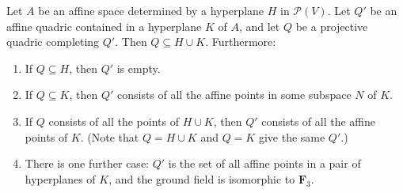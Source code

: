 Let $A$ be an affine space determined by a hyperplane $H$ in $\mathcal{P}(V)$. Let $Q'$ be an affine quadric contained in a hyperplane $K$ of $A$, and let $Q$ be a projective quadric completing $Q'$. Then $Q \subseteq H \cup K$. Furthermore:

\begin{enumerate}
\item If $Q \subseteq H$, then $Q'$ is empty.
\item If $Q \subseteq K$, then $Q'$ consists of all the affine points in some subspace $N$ of $K$.
\item If $Q$ consists of all the points of $H \cup K$, then $Q'$ consists of all the affine points of $K$. (Note that $Q = H \cup K$ and $Q = K$ give the same $Q'$.)
\item There is one further case: $Q'$ is the set of all affine points in a pair of hyperplanes of $K$, and the ground field is isomorphic to $\mathbf{F}_3$.
\end{enumerate}
